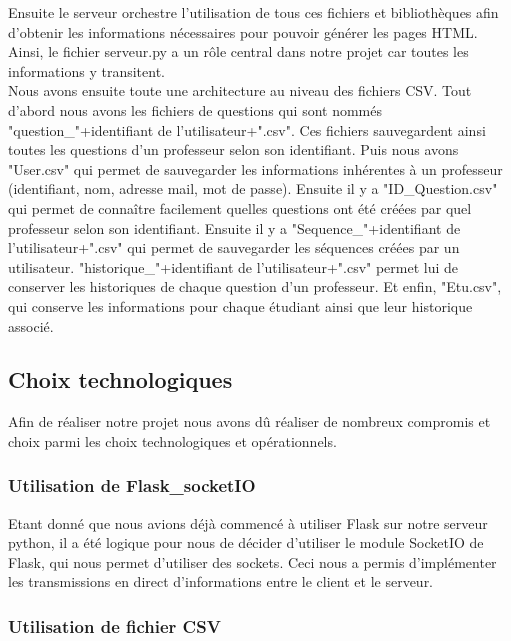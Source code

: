 \documentclass[a4paper, 12pt]{article}
\begin{document}
Ensuite le serveur orchestre l'utilisation de tous ces fichiers et bibliothèques afin d'obtenir les informations nécessaires pour pouvoir générer les pages HTML. 
Ainsi, le fichier serveur.py a un rôle central dans notre projet car toutes les informations y transitent.\\
Nous avons ensuite toute une architecture au niveau des fichiers CSV. Tout d'abord nous avons les
fichiers de questions qui sont nommés "question\_"+identifiant de l'utilisateur+".csv". Ces fichiers
sauvegardent ainsi toutes les questions d'un professeur selon son identifiant. Puis nous avons "User.csv" qui permet de sauvegarder les informations inhérentes à un professeur (identifiant, nom, adresse mail, mot de passe). Ensuite il y a "ID\_Question.csv" qui permet de connaître facilement quelles questions ont été créées par quel professeur selon son identifiant. Ensuite il y a "Sequence\_"+identifiant de l'utilisateur+".csv" qui permet de sauvegarder les séquences créées par un utilisateur. "historique\_"+identifiant de l'utilisateur+".csv" permet lui de conserver les historiques de chaque question d'un professeur. Et enfin, "Etu.csv", qui conserve les informations pour chaque étudiant ainsi que leur historique associé.

\subsection{Choix technologiques}

Afin de réaliser notre projet nous avons dû réaliser de nombreux compromis et choix parmi les choix technologiques et opérationnels.

 \subsubsection{Utilisation de Flask\_socketIO}

 Etant donné que nous avions déjà commencé à utiliser Flask sur notre serveur python, il a été logique pour nous de décider d'utiliser le module SocketIO de Flask, qui nous permet d'utiliser des sockets. 
 Ceci nous a permis d'implémenter les transmissions en direct d'informations entre le client et le serveur.

 \newpage

 \subsubsection{Utilisation de fichier CSV}
 
\end{document}
